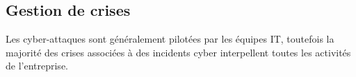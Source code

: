 %
%

\subsection{Gestion de crises}


Les cyber-attaques sont généralement pilotées par les équipes IT, toutefois la majorité des crises associées à des incidents cyber interpellent toutes les activités de l'entreprise.   
%
%
%

